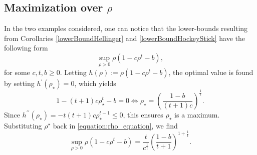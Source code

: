 \documentclass[conference]{IEEEtran}
\theoremstyle{plain}
\theoremstyle{definition}
\theoremstyle{remark}
\begin{document}
\subsection{Maximization over $\rho$}\label{appendix:optimization_rho}
In the two examples considered, one can notice that the lower-bounds resulting from Corollaries \ref{lowerBoundHellinger} and \ref{lowerBoundHockeyStick} have the following form
\begin{equation} \label{equation:rho_equation}
\sup_{\rho>0} \rho(1-c\rho^t-b),
\end{equation}
for some $c, t, b\geq 0$. Letting $ h(\rho):=\rho(1-c\rho^t-b)$, the optimal value is found by setting $h^\prime(\rho_\star) = 0$, which yields
\begin{equation}
    1-(t+1)c\rho_\star^t-b=0 \iff \rho_\star = \left(\frac{1-b}{(t+1)c}\right)^{\frac{1}{t}}. 
\end{equation}
Since $h^{\prime\prime}(\rho_\star) = -t(t+1)c\rho_\star^{t-1} \leq 0$, this ensures $\rho_\star$ is a maximum. Substituting $\rho^\star$ back in \eqref{equation:rho_equation}, we find
\begin{equation}
    \sup_{\rho>0} \rho(1-c\rho^t-b)=\frac{t}{c^{\frac1t}}\left(\frac{1-b}{t+1}\right)^{1+\frac1t}.\label{rhoStar}
\end{equation}
\end{document}
